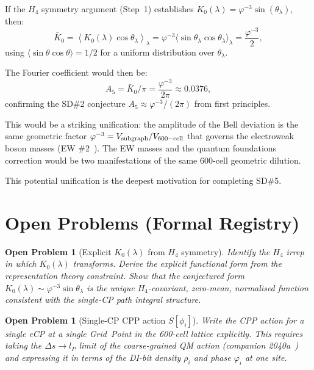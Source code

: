 \documentclass[11pt,letterpaper]{article}
\newtheorem{openprob}[theorem]{Open Problem}
\newcommand{\lP}{l_P}
\newcommand{\phig}{\varphi}
\begin{document}
If the $H_4$ symmetry argument (Step~1) establishes
$K_0(\lambda) = \phig^{-3} \sin(\theta_\lambda)$, then:
\begin{equation}
\bar K_0
= \left\langle K_0(\lambda)\cos\theta_\lambda \right\rangle_\lambda
= \phig^{-3} \langle\sin\theta_\lambda\cos\theta_\lambda\rangle_\lambda
= \frac{\phig^{-3}}{2},
\label{eq:K0bar_if}
\end{equation}
using $\langle\sin\theta\cos\theta\rangle = 1/2$ for a uniform
distribution over $\theta_\lambda$.

The Fourier coefficient would then be:
\begin{equation}
A_5 = \bar K_0 / \pi = \frac{\phig^{-3}}{2\pi} \approx 0.0376,
\label{eq:A5_from_K0}
\end{equation}
confirming the SD\#2 conjecture $A_5 \approx \phig^{-3}/(2\pi)$
from first principles.

This would be a striking unification: the amplitude of the Bell
deviation is the same geometric factor $\phig^{-3} = V_{\rm
subgraph}/V_{\rm 600-cell}$ that governs the electroweak boson
masses (EW \#2~\citep{cpp_ew2}).  The EW masses and the quantum
foundations correction would be two manifestations of the same
600-cell geometric dilution.

This potential unification is the deepest motivation for completing
SD\#5.

\section{Open Problems (Formal Registry)}

\begin{openprob}[Explicit $K_0(\lambda)$ from $H_4$ symmetry]
\label{op:K0_symmetry}
Identify the $H_4$ irrep in which $K_0(\lambda)$ transforms.
Derive the explicit functional form from the representation
theory constraint.  Show that the conjectured form
$K_0(\lambda) \sim \phig^{-3}\sin\theta_\lambda$ is the unique
$H_4$-covariant, zero-mean, normalised function consistent with
the single-CP path integral structure.
\end{openprob}

\begin{openprob}[{Single-CP CPP action $S[\phi_i]$}]
\label{op:single_action}
Write the CPP action for a single eCP at a single Grid~Point in
the 600-cell lattice explicitly.  This requires taking the
$\Delta s \to \lP$ limit of the coarse-grained QM action
(companion 2040a~\citep{cpp2040a}) and expressing it in terms of
the DI-bit density $\rho_i$ and phase $\varphi_i$ at one site.
\end{openprob}
\end{document}

